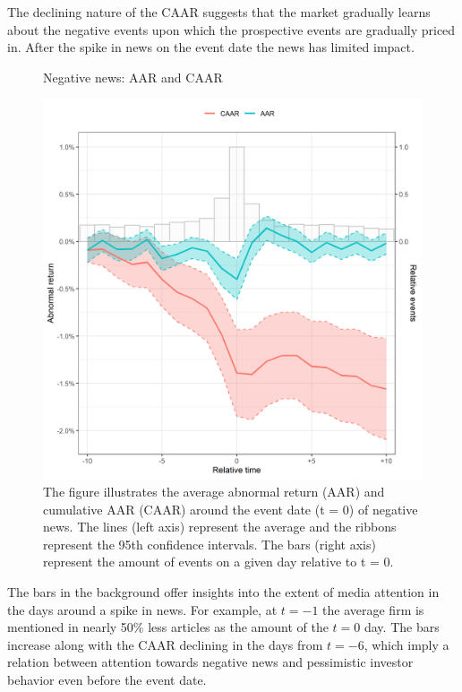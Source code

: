 The declining nature of the CAAR suggests that the market gradually learns about the negative events upon which the prospective events are gradually priced in. After the spike in news on the event date the news has limited impact. \\ 


\begin{figure} [H]
    \centering
    \caption{Negative news: AAR and CAAR}
    \includegraphics[scale=0.6]{Projekt/1.Figures analysis/ST_negative_all_CI.png}
     \caption*{\footnotesize The figure illustrates the average abnormal return (AAR) and cumulative AAR (CAAR) around the event date (t = 0) of negative news. The lines (left axis) represent the average and the ribbons represent the 95th confidence intervals. The bars (right axis) represent the amount of events on a given day relative to t = 0. }
    \label{fig:ST_neg_news}
\end{figure} 

 
The bars in the background offer insights into the extent of media attention in the days around a spike in news. For example, at $t = -1$ the average firm is mentioned in nearly 50\% less articles as the amount of the $t = 0$ day. The bars increase along with the CAAR declining in the days from $t=-6$, which imply a relation between attention towards negative news and pessimistic investor behavior even before the event date. 

